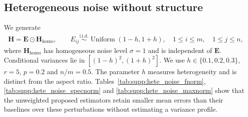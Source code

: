 \documentclass[numsec,webpdf,modern,large,namedate]{oup-authoring-template}
\theoremstyle{plain}
\theoremstyle{remark}
\newcommand{\bH}{\bm{H}}
\begin{document}
\subsection{Heterogeneous noise without structure}
We generate
\begin{align*}
 \bH=\bm E\odot\bH_{\mathrm{homo}},\qquad
 E_{ij}\stackrel{\mathrm{i.i.d.}}{\sim}\operatorname{Uniform}(1-h,1+h),
 \quad 1\le i\le m,\quad1\le j\le n,
\end{align*}
where $\bH_{\mathrm{homo}}$ has homogeneous noise level $\sigma=1$ and is independent of $\bm E$. Conditional variances lie in $[(1-h)^2,(1+h)^2]$. We use $h\in\{0.1,0.2,0.3\}$, $r=5$, $p=0.2$ and $n/m=0.5$. The parameter $h$ measures heterogeneity and is distinct from the aspect ratio. Tables~\ref{tab:supp:hete_noise_fnorm}, \ref{tab:supp:hete_noise_specnorm} and \ref{tab:supp:hete_noise_maxnorm} show that the unweighted proposed estimators retain smaller mean errors than their baselines over these perturbations without estimating a variance profile.
\end{document}
